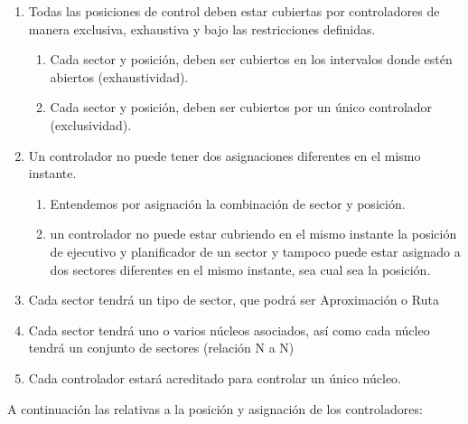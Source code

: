 \begin{enumerate}[label={\textbf{RD\arabic*}}, ref={RD\arabic*},  align=left]
	
	\item Todas las posiciones de control deben estar cubiertas por controladores de manera exclusiva, exhaustiva y bajo las restricciones definidas.
	\begin{enumerate}[label*={\textbf{.\arabic*}}]
		\item Cada sector y posición, deben ser cubiertos en los intervalos donde estén abiertos (exhaustividad).
		\item Cada sector y posición, deben ser cubiertos por un único controlador (exclusividad).
	\end{enumerate}
	
	\item Un controlador no puede tener dos asignaciones diferentes en el mismo instante.
	\begin{enumerate}[label*={\textbf{.\arabic*}}]
		\item Entendemos por asignación la combinación de sector y posición.
		\item un controlador no puede estar cubriendo en el mismo
		instante la posición de ejecutivo y planificador de un sector y tampoco puede estar
		asignado a dos sectores diferentes en el mismo instante, sea cual sea la posición.
	\end{enumerate}

	\item \label{RD:tipos-sector}  Cada sector tendrá un tipo de sector, que podrá ser Aproximación o Ruta

	\item  \label{RD:sector-nucleo} Cada sector tendrá uno o varios núcleos asociados, así como cada núcleo tendrá un conjunto de sectores (relación N a N)
	
	\item \label{RD:nucleo-controlador} Cada controlador estará acreditado para controlar un único núcleo.

\end{enumerate}



A continuación las relativas a la posición y asignación de los controladores:

